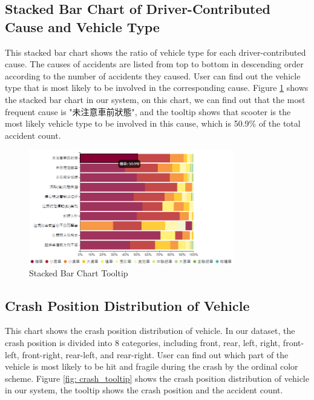 \documentclass[a4paper, oneside, final, 12pt]{scrartcl} %
\begin{document}
\subsection{Stacked Bar Chart of Driver-Contributed Cause and Vehicle Type}

This stacked bar chart shows the ratio of vehicle type for each driver-contributed cause.
The causes of accidents are listed from top to bottom in 
descending order according to the number of accidents they caused.
User can find out the vehicle type that is 
most likely to be involved in the corresponding cause.
Figure \ref{fig: stacked_tooltip} shows the stacked bar chart in our system,
on this chart, we can find out that the most frequent cause is
"未注意車前狀態", and the tooltip shows that scooter is the most likely vehicle type
to be involved in this cause, which is 50.9\% of the total accident count.

\begin{figure}[htbp]
  \centering
  \includegraphics[width=0.8\textwidth]{"./Image/stacked_tooltip.png"}
  \caption{Stacked Bar Chart Tooltip}
  \label{fig: stacked_tooltip}
\end{figure}

\subsection{Crash Position Distribution of Vehicle}

This chart shows the crash position distribution of vehicle.
In our dataset, the crash position is divided into 8 categories,
including front, rear, left, right, front-left, front-right, rear-left, and rear-right.
User can find out which part of the vehicle is most likely to be hit
and fragile during the crash by the ordinal color scheme.
Figure \ref{fig: crash_tooltip} shows the crash position distribution of vehicle in our system,
the tooltip shows the crash position and the accident count.
\end{document}
